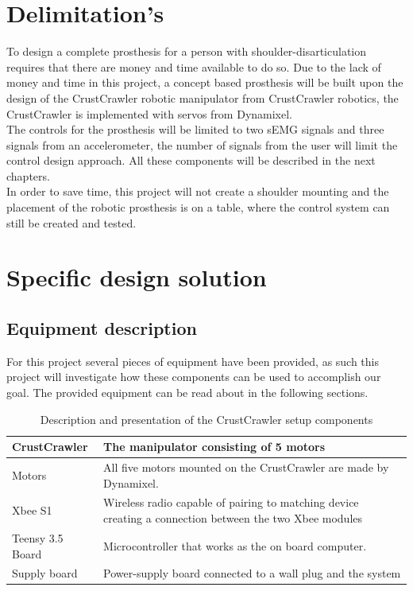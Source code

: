 \section{Delimitation's}\label{Delimitations}
To design a complete prosthesis for a person with shoulder-disarticulation requires that there are money and time available to do so. Due to the lack of money and time in this project, a concept based prosthesis will be built upon the design of the CrustCrawler robotic manipulator from CrustCrawler robotics, the CrustCrawler is implemented with servos from Dynamixel. \\
The controls for the prosthesis will be limited to two sEMG signals and three signals from an accelerometer, the number of signals from the user will limit the control design approach. All these components will be described in the next chapters.\\
In order to save time, this project will not create a shoulder mounting and the placement of the robotic prosthesis is on a table, where the control system can still be created and tested.


\section{Specific design solution}
\subsection*{Equipment description}
For this project several pieces of equipment have been provided, as such this project will investigate how these components can be used to accomplish our goal. The provided equipment can be read about in the following sections.


\begin{table}[H]
\begin{tabular}{|P{3cm}||P{10cm}|}

\hline
CrustCrawler & The manipulator consisting of 5 motors \\ \hline
Motors                 & All five motors mounted on the CrustCrawler are made by Dynamixel.  \\ \hline
Xbee S1                  & Wireless radio capable of pairing to matching device creating a connection between the two Xbee modules \\ \hline
Teensy 3.5 Board              & Microcontroller that works as the on board computer.      \\ \hline
Supply  board             & Power-supply board connected to a wall plug and the system                  \\ \hline
\end{tabular}%
\caption{Description and presentation of the CrustCrawler setup components}
\label{tableCrust}
\end{table}


